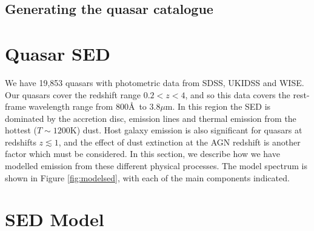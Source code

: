 
\subsection{Generating the quasar catalogue}

\section{Quasar SED}

We have 19,853 quasars with photometric data from SDSS, UKIDSS and WISE. 
Our quasars cover the redshift range $0.2 < z < 4$, and so this data covers the rest-frame wavelength range from 800\AA\, to 3.8$\mu$m. 
In this region the SED is dominated by the accretion disc, emission lines and thermal emission from the hottest ($T\sim1200$K) dust. 
Host galaxy emission is also significant for quasars at redshifts $z\lesssim1$, and the effect of dust extinction at the AGN redshift is another factor which must be considered.   
In this section, we describe how we have modelled emission from these different physical processes. 
The model spectrum is shown in Figure \ref{fig:modelsed}, with each of the main components indicated. 

\section{SED Model}


